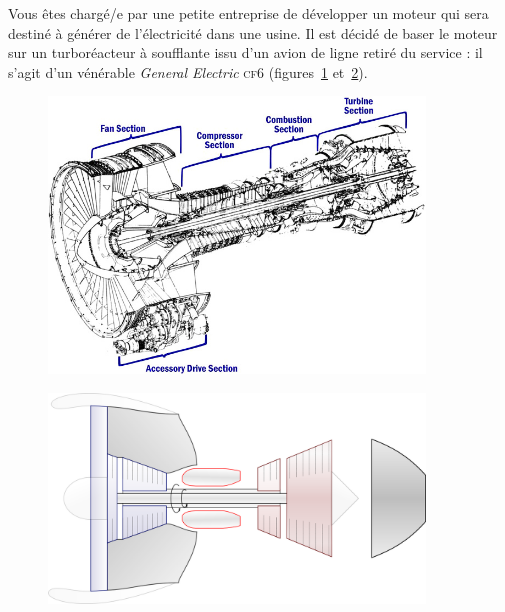 	Vous êtes chargé/e par une petite entreprise de développer un moteur qui sera destiné à générer de l’électricité dans une usine. Il est décidé de baser le moteur sur un turboréacteur à soufflante issu d’un avion de ligne retiré du service : il s’agit d’un vénérable \textit{General Electric} \textsc{cf6} (figures~\ref{fig_cf6_1} et~\ref{fig_cf6_2}).
	
	\begin{figure}
		\begin{center}
		\includegraphics[width=10cm]{images/cf6_cutaway.jpg}
		\end{center}
		\label{fig_cf6_1}
	\end{figure}
	
	\begin{figure}
		\begin{center}
		\onlyamphibook{\vspace{-0.5cm}}
		\includegraphics[width=10cm]{images/circuit_turbofan_twin_spool.png}
		\end{center}
		\label{fig_cf6_2}
	\end{figure}
	
